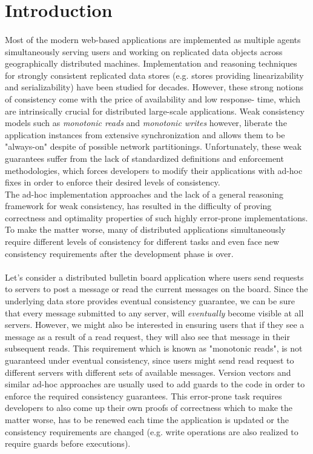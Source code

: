 \section{Introduction}
\paragraph{} Most of the modern web-based applications are implemented as
multiple agents simultaneously serving users and working on replicated data objects across 
geographically distributed machines. Implementation and reasoning techniques for strongly 
consistent replicated data stores (e.g. stores providing linearizability and serializability) have been 
studied for decades. 
However, these strong notions of consistency come with the price of availability and low response-
time, which are intrinsically crucial for distributed large-scale applications. Weak consistency models 
such as \emph{monotonic reads} and \emph{monotonic writes} however, liberate the application 
instances from extensive synchronization and allows them to be "always-on" despite of possible 
network partitionings. 
Unfortunately, these weak guarantees suffer from the lack of standardized definitions and 
enforcement methodologies, which forces developers to modify their applications with ad-hoc 
fixes in order to enforce their desired levels of consistency. 
\\ The ad-hoc implementation approaches and the lack of a general reasoning 
framework for weak consistency, has resulted in the difficulty of proving correctness and 
optimality properties of such highly error-prone implementations. To make the matter worse, 
many of distributed applications simultaneously require different levels of consistency for 
different tasks and even face new consistency requirements after the development phase is over. 
\paragraph{} Let's consider a distributed bulletin board application where users send 
requests to servers to post a message or read the current messages on the board. Since the 
underlying data store provides eventual consistency guarantee, we can be sure that every 
message submitted to any server, will \emph{eventually} become visible at all servers. 
However, we might also be interested in ensuring users that if they see a message as a result of a 
read request, they will also see that message in their subsequent reads. This requirement which is 
known as "monotonic reads", is not guaranteed under eventual consistency, since users might 
send read request to different servers with different sets of available messages. 
Version vectors and similar ad-hoc approaches are usually used to add guards to the code in 
order to enforce the required consistency guarantees. This error-prone task requires 
developers to also come up their own proofs of correctness which to make the 
matter worse, has to be renewed each time the application is updated or the 
consistency requirements are changed (e.g. write operations are also realized 
to require guards before executions). 

